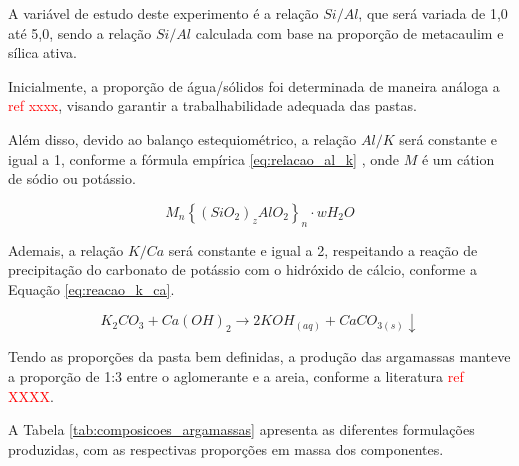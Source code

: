 A variável de estudo deste experimento é a relação $Si/Al$, que será variada de 1,0 até 5,0, sendo a relação $Si/Al$ calculada com base na proporção de metacaulim e sílica ativa.

Inicialmente, a proporção de água/sólidos foi determinada de maneira análoga a \textcolor{red}{ref xxxx}, visando garantir a trabalhabilidade adequada das pastas.

Além disso, devido ao balanço estequiométrico, a relação $Al/K$ será constante e igual a 1, conforme a fórmula empírica \ref{eq:relacao_al_k} \cite{joseph1991geopolymers}, onde $M$ é um cátion de sódio ou potássio.

\begin{equation}
    \label{eq:relacao_al_k}
    M_n \left\{ \left(SiO_2 \right)_z AlO_2 \right\}_n \cdot wH_2O
\end{equation}

Ademais, a relação $K/Ca$ será constante e igual a 2, respeitando a reação de precipitação do carbonato de potássio com o hidróxido de cálcio, conforme a Equação \ref{eq:reacao_k_ca}.

\begin{equation}
    \label{eq:reacao_k_ca}
    K_2CO_3 + Ca(OH)_2 \rightarrow  2KOH_{(aq)} + CaCO_{3(s)} \downarrow
\end{equation}

Tendo as proporções da pasta bem definidas, a produção das argamassas manteve a proporção de 1:3 entre o aglomerante e a areia, conforme a literatura \textcolor{red}{ref XXXX}.


A Tabela \ref{tab:composicoes_argamassas} apresenta as diferentes formulações produzidas, com as respectivas proporções em massa dos componentes.

